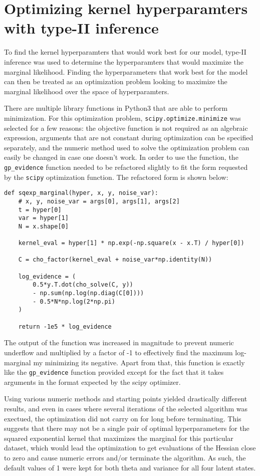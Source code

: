 \documentclass{article}
\begin{document}
\section{Optimizing kernel hyperparamters with type-II inference}
To find the kernel hyperparamters that would work best for our model, type-II inference was used to determine the hyperparamters that would maximize the marginal likelihood. Finding the hyperparameters that work best for the model can then be treated as an optimization problem looking to maximize the marginal likelihood over the space of hyperparamters.

There are multiple library functions in Python3 that are able to perform minimization. For this optimization problem, \verb+scipy.optimize.minimize+ was selected for a few reasons: the objective function is not required as an algebraic expression, arguments that are not constant during optimization can be specified separately, and the numeric method used to solve the optimization problem can easily be changed in case one doesn't work. In order to use the function, the \verb+gp_evidence+ function needed to be refactored slightly to fit the form requested by the \verb+scipy+ optimization function. The refactored form is shown below:

\begin{verbatim}
def sqexp_marginal(hyper, x, y, noise_var):
    # x, y, noise_var = args[0], args[1], args[2]
    t = hyper[0]
    var = hyper[1]
    N = x.shape[0]
    
    kernel_eval = hyper[1] * np.exp(-np.square(x - x.T) / hyper[0])

    C = cho_factor(kernel_eval + noise_var*np.identity(N))
    
    log_evidence = (
        0.5*y.T.dot(cho_solve(C, y))
        - np.sum(np.log(np.diag(C[0])))
        - 0.5*N*np.log(2*np.pi)
    )

    return -1e5 * log_evidence
\end{verbatim}

The output of the function was increased in magnitude to prevent numeric underflow and multiplied by a factor of -1 to effectively find the maximum log-marginal my minimizing its negative. Apart from that, this function is exactly like the \verb+gp_evidence+ function provided except for the fact that it takes arguments in the format expected by the scipy optimizer.

Using various numeric methods and starting points yielded drastically different results, and even in cases where several iterations of the selected algorithm was exectued, the optimization did not carry on for long before terminating. This suggests that there may not be a single pair of optimal hyperparameters for the squared exponential kernel that maximizes the marginal for this particular dataset, which would lead the optimization to get evaluations of the Hessian close to zero and cause numeric errors and/or terminate the algorithm. As such, the default values of 1 were kept for both theta and variance for all four latent states.
\end{document}
